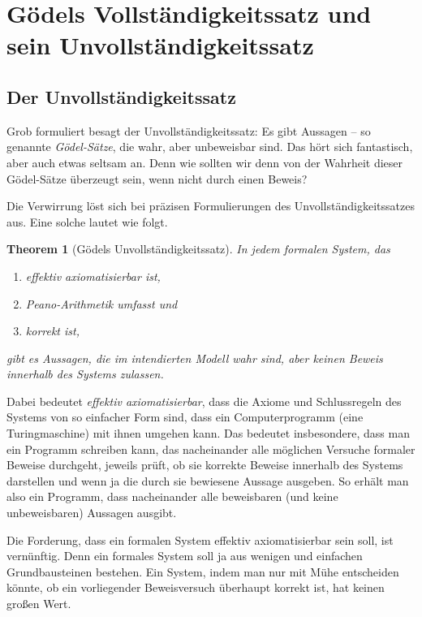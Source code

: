 \documentclass[twoside]{../zirkelblatt1415}
\theoremstyle{definition}
\theoremstyle{plain}
\newtheorem{thm}[defn]{Theorem}
\theoremstyle{remark}
\begin{document}
\newpage


\section{Gödels Vollständigkeitssatz und sein Unvollständigkeitssatz}

\subsection{Der Unvollständigkeitssatz}

Grob formuliert besagt der Unvollständigkeitssatz: Es gibt Aussagen -- so
genannte \emph{Gödel-Sätze}, die wahr, aber unbeweisbar sind. Das hört sich
fantastisch, aber auch etwas seltsam an. Denn wie sollten wir denn von der
Wahrheit dieser Gödel-Sätze überzeugt sein, wenn nicht durch einen Beweis?

Die Verwirrung löst sich bei präzisen Formulierungen des
Unvollständigkeitssatzes aus. Eine solche lautet wie folgt.

\begin{thm}[Gödels Unvollständigkeitssatz]In jedem formalen System, das
\begin{enumerate}
\item effektiv axiomatisierbar ist,
\item Peano-Arithmetik umfasst und
\item korrekt ist,
\end{enumerate}
gibt es Aussagen, die im intendierten Modell wahr sind, aber keinen Beweis
innerhalb des Systems zulassen.
\end{thm}

Dabei bedeutet \emph{effektiv axiomatisierbar}, dass die Axiome und
Schlussregeln des Systems von so einfacher Form sind, dass ein Computerprogramm
(eine Turingmaschine) mit ihnen umgehen kann. Das bedeutet insbesondere, dass
man ein Programm schreiben kann, das nacheinander alle möglichen Versuche
formaler Beweise durchgeht, jeweils prüft, ob sie korrekte Beweise innerhalb des
Systems darstellen und wenn ja die durch sie bewiesene Aussage ausgeben. So
erhält man also ein Programm, dass nacheinander alle beweisbaren (und keine
unbeweisbaren) Aussagen ausgibt.

Die Forderung, dass ein formalen System effektiv axiomatisierbar sein soll, ist
vernünftig. Denn ein formales System soll ja aus wenigen und einfachen
Grundbausteinen bestehen. Ein System, indem man nur mit Mühe entscheiden
könnte, ob ein vorliegender Beweisversuch überhaupt korrekt ist, hat keinen
großen Wert.
\end{document}
